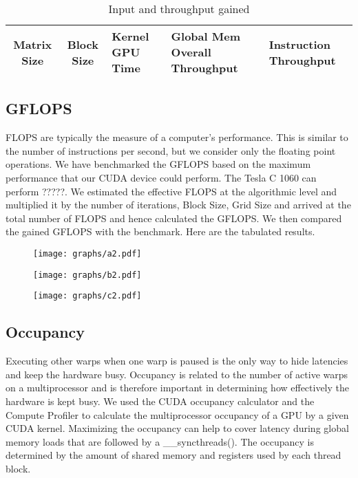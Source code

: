 \documentclass[10pt]{article}
\begin{document}
\begin{multicols}{2}
    \begin{table}\footnotesize
    \centering
        \begin{tabular}{ | c | c | p{1.2cm} | p{1.5cm} | p{1.0cm} | }
        \hline
        Matrix Size & Block Size & Kernel GPU Time & Global Mem Overall Throughput & Instruction Throughput \\
        \hline
        \end{tabular}
        \caption{Input and throughput gained}
        \label{tab:input_throughput}
    \end{table}

    \subsection{GFLOPS}
    FLOPS are typically the measure of a computer’s performance.
    This is similar to the number of instructions per second, but we consider only the floating point operations.
    We have benchmarked the GFLOPS based on the maximum performance that our CUDA device could perform.
    The Tesla C 1060 can perform ?????.
    We estimated the effective FLOPS at the algorithmic level and multiplied it by the number of iterations, Block Size, Grid Size and arrived at the total number of FLOPS and hence calculated the GFLOPS.
    We then compared the gained GFLOPS with the benchmark.
    Here are the tabulated results.

    \begin{figure*}
        \centering
        \texttt{[image: graphs/a2.pdf]}
        \caption{}
        \label{fig:gflops1}
    \end{figure*}

    \begin{figure*}
        \centering
        \texttt{[image: graphs/b2.pdf]}
        \caption{}
        \label{fig:gflops2}
    \end{figure*}

    \begin{figure*}
        \centering
        \texttt{[image: graphs/c2.pdf]}
        \caption{}
        \label{fig:gflops3}
    \end{figure*}

    \subsection{Occupancy}
    Executing other warps when one warp is paused is the only way to hide latencies and keep the hardware busy.
    Occupancy is related to the number of active warps on a multiprocessor and is therefore important in determining how effectively the hardware is kept busy.
    We used the CUDA occupancy calculator and the Compute Profiler  to calculate the multiprocessor occupancy of a GPU by a given CUDA kernel.
    Maximizing the occupancy can help to cover latency during global memory loads that are followed by a \_\_syncthreads().
    The occupancy is determined by the amount of shared memory and registers used by each thread block.


\end{multicols}
\end{document}
